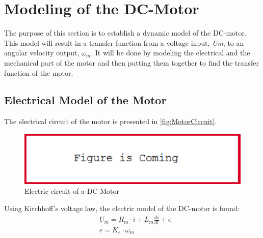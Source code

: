 \section{Modeling of the DC-Motor}

The purpose of this section is to establish a dynamic model of the DC-motor. This model will result in a transfer function from a voltage input, \textit{Um}, to an angular velocity output, \textit{$\omega_m$}. It will be done by modeling the electrical and the mechanical part of the motor and then putting them together to find the transfer function of the motor.

\subsection*{Electrical Model of the Motor}
The electrical circuit of the motor is presented in \autoref{fig:MotorCircuit}.

\begin{figure}[htbp]
	\centering
 	\includegraphics[width=1\textwidth]{figures/FigureIsComing.PNG} 
 	\caption{Electric circuit of a DC-Motor}
 	\label{fig:MotorCircuit}
\end{figure}

Using Kirchhoff's voltage law, the electric model of the DC-motor is found:
\begin{subequations} \label{eq:tech_ToA}
	\begin{flalign}
		&U_m = R_m \cdot i + L_m \frac{di}{dt} + e \\
		&e = K_e \cdot \omega_m 
	\end{flalign}
\end{subequations}

\startexplain
\stopexplain


